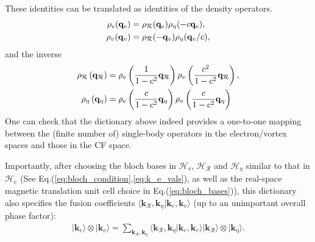 These identities can be translated as identities of the density operators.
\begin{align}
    \rho_e(\mathbf q_e) & =\rho_{\mathcal R}(\mathbf q_e)\rho_{\eta}(-c\mathbf q_e),\notag                              \\
    \rho_v(\mathbf q_v) & =\rho_{\mathcal R}(-\mathbf q_v)\rho_{\eta}(\mathbf q_v/c),\label{eq:CF_substitution_density}
\end{align}
and the inverse
\begin{align}
    \rho_{\mathcal R}\left(\mathbf q_{\mathcal R}\right) & =\rho_e\left(\frac{1}{1-c^2}\mathbf q_{\mathcal R}\right)\rho_v\left(\frac{c^2}{1-c^2}\mathbf q_{\mathcal R}\right),\notag \\
    \rho_{\eta}\left(\mathbf q_{\eta}\right)             & =\rho_e\left(\frac{c}{1-c^2}\mathbf q_{\eta}\right)\rho_v\left(\frac{c}{1-c^2}\mathbf q_{\eta}\right)
\end{align}
One can check that the dictionary above indeed provides a one-to-one mapping between the (finite number of) single-body operators in the electron/vortex spaces and those in the CF space.

Importantly, after choosing the bloch bases in $\mathcal H_v$, $\mathcal H_{\mathcal R}$ and $\mathcal H_{\eta}$ similar to that in $\mathcal H_e$ (See Eq.(\ref{eq:bloch_condition},\ref{eq:k_e_vals}), as well as the real-space magnetic translation unit cell choice in Eq.(\ref{eq:bloch_bases})), this dictionary also specifies the fusion coefficients $\langle  \mathbf k_{\mathcal R},\mathbf k_{\eta}  |\mathbf k_e,\mathbf k_v\rangle$ (up to an unimportant overall phase factor):
\begin{align}
    |\mathbf k_e\rangle\otimes |\mathbf k_v\rangle = \sum_{\mathbf k_{\mathcal R},\mathbf k_{\eta}} \langle  \mathbf k_{\mathcal R},\mathbf k_{\eta}  |\mathbf k_e,\mathbf k_v\rangle |\mathbf k_{\mathcal R}\rangle\otimes |\mathbf k_{\eta}\rangle.\label{eq:CG_coeff}
\end{align}

